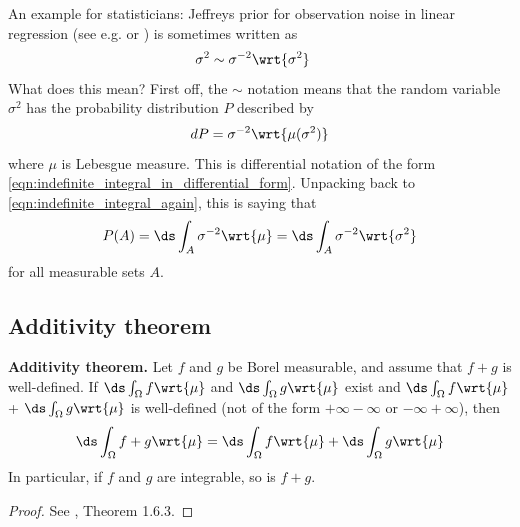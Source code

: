 \documentclass{article} %
\newcommand{\dint}{\ds\int}
\newcommand{\dmu}{\wrt{\mu}}
\begin{document}
\begin{example-for-data-scientists}{}
An example for statisticians: Jeffreys prior for observation noise in linear regression  (see e.g. \cite{carvalho2010horseshoe} or \cite{makalic2015simple}) is sometimes written as
\begin{align}
 \sigma^2 &\sim \sigma^{-2} \wrt{\sigma^2} \label{eqn:prior_on_observation_noise_for_linear_regression_model_with_horseshoe_prior_jeffreys_special_case}
\end{align}
%
What does this mean?  First off, the $\sim$ notation means that the random variable $\sigma^2$ has the probability distribution $P$ described by
\[  dP = \sigma^{-2} \wrt{\mu(\sigma^2)} \]
where $\mu$ is Lebesgue measure. This is differential notation of the form \eqref{eqn:indefinite_integral_in_differential_form}.  Unpacking back to 	\eqref{eqn:indefinite_integral_again}, this is saying that
\[  P(A) = \ds\int_A \sigma^{-2} \dmu  = \ds\int_A \sigma^{-2} \wrt{\sigma^2} \]
for all measurable sets $A$.
\end{example-for-data-scientists}

\subsection{Additivity theorem}
 
\begin{theorem}{\textbf{Additivity theorem.}}
Let $f$ and $g$ be Borel measurable, and assume that $f+g$ is well-defined.  If $\dint_\Omega f \dmu$ and $\dint_\Omega g \dmu$ exist and $\dint_\Omega f \dmu$ + $\dint_\Omega g \dmu$ is well-defined (not of the form $+ \infty - \infty$ or $- \infty +\infty$), then 
\[ \dint_\Omega f +g \dmu = \dint_\Omega f \dmu + \dint_\Omega g \dmu \]
In particular, if $f$ and $g$ are integrable, so is $f+g$.
\label{thm:additivity}
\end{theorem}

\begin{proof}
See \cite{ash2000probability}, Theorem 1.6.3.	
\end{proof}
\end{document}
